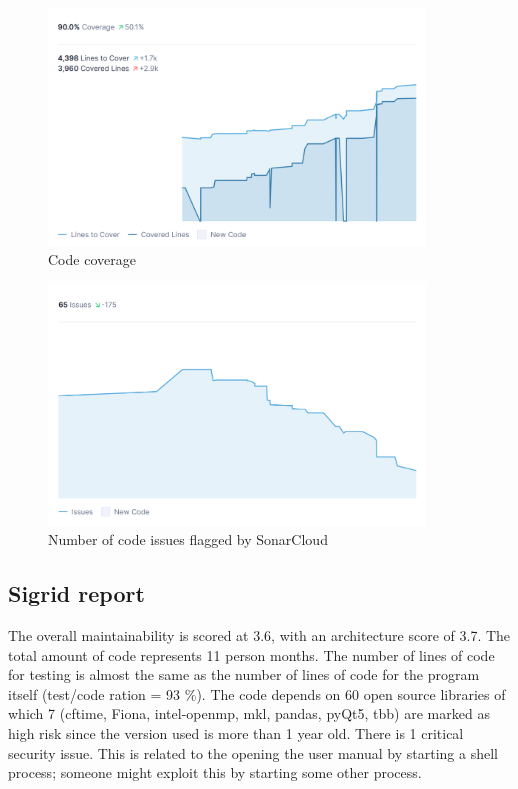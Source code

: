 \begin{figure}
\center
\includegraphics[width=10cm]{figures/code_coverage.png}
\caption{Code coverage}
\label{fig:code_coverage}
\end{figure}

\begin{figure}
\center
\includegraphics[width=10cm]{figures/code_issues.png}
\caption{Number of code issues flagged by SonarCloud}
\label{fig:code_issues}
\end{figure}

\subsection{Sigrid report}
The overall maintainability is scored at 3.6, with an architecture score of 3.7.
The total amount of code represents 11 person months.
The number of lines of code for testing is almost the same as the number of lines of code for the program itself (test/code ration = 93 \%).
The code depends on 60 open source libraries of which 7 (cftime, Fiona, intel-openmp, mkl, pandas, pyQt5, tbb) are marked as high risk since the version used is more than 1 year old.
There is 1 critical security issue.
This is related to the opening the user manual by starting a shell process; someone might exploit this by starting some other process.

